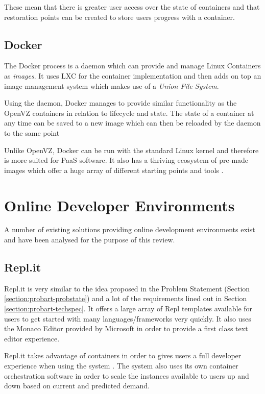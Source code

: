 These mean that there is greater user access over the state of containers and that restoration points can be created to store users progress with a container.

\subsection{Docker}

The Docker process is a daemon which can provide and manage Linux Containers as \textit{images}. It uses LXC for the container implementation and then adds on top an image management system which makes use of a \textit{Union File System}.

Using the daemon, Docker manages to provide similar functionality as the OpenVZ containers in relation to lifecycle and state. The state of a container at any time can be saved to a new image which can then be reloaded by the daemon to the same point

Unlike OpenVZ, Docker can be run with the standard Linux kernel and therefore is more suited for PaaS software. It also has a thriving ecosystem of pre-made images which offer a huge array of different starting points and tools \cite{dockerhub}.

\section{Online Developer Environments} \label{lit-ode}

A number of existing solutions providing online development environments exist and have been analysed for the purpose of this review.

\subsection{Repl.it}

Repl.it is very similar to the idea proposed in the Problem Statement (Section \ref{section:probart-probstate}) and a lot of the requirements lined out in Section \ref{section:probart-techspec}. It offers a large array of Repl templates available for users to get started with many languages/frameworks very quickly. It also uses the Monaco Editor provided by Microsoft in order to provide a first class text editor experience.

Repl.it takes advantage of containers in order to gives users a full developer experience when using the system \cite{replit-containers}. The system also uses its own container orchestration software in order to scale the instances available to users up and down based on current and predicted demand.

